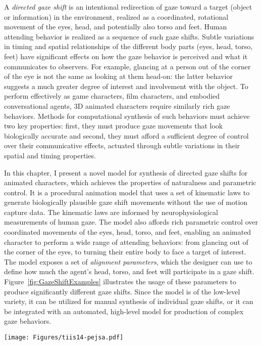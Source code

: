 A \emph{directed gaze shift} is an intentional redirection of gaze toward a target (object or information) in the environment, realized as a coordinated, rotational movement of the eyes, head, and potentially also torso and feet. Human attending behavior is realized as a sequence of such gaze shifts. Subtle variations in timing and spatial relationships of the different body parts (eyes, head, torso, feet) have significant effects on how the gaze behavior is perceived and what it communicates to observers. For example, glancing at a person out of the corner of the eye is not the same as looking at them head-on: the latter behavior suggests a much greater degree of interest and involvement with the object. To perform effectively as game characters, film characters, and embodied conversational agents, 3D animated characters require similarly rich gaze behaviors. Methods for computational synthesis of such behaviors must achieve two key properties: first, they must produce gaze movements that look biologically accurate and second, they must afford a sufficient degree of control over their communicative effects, actuated through subtle variations in their spatial and timing properties.

In this chapter, I present a novel model for synthesis of directed gaze shifts for animated characters, which achieves the properties of naturalness and parametric control. It is a procedural animation model that uses a set of kinematic laws to generate biologically plausible gaze shift movements without the use of motion capture data. The kinematic laws are informed by neurophysiological measurements of human gaze. The model also affords rich parametric control over coordinated movements of the eyes, head, torso, and feet, enabling an animated character to perform a wide range of attending behaviors: from glancing out of the corner of the eyes, to turning their entire body to face a target of interest. The model exposes a set of \emph{alignment parameters}, which the designer can use to define how much the agent's head, torso, and feet will participate in a gaze shift. Figure~\ref{fig:GazeShiftExamples} illustrates the usage of these parameters to produce significantly different gaze shifts. Since the model is of the low-level variety, it can be utilized for manual synthesis of individual gaze shifts, or it can be integrated with an automated, high-level model for production of complex gaze behaviors.

\begin{figure*}
\centering
\texttt{[image: Figures/tiis14-pejsa.pdf]}
\caption{Examples of gaze shifts synthesized using our model. All gaze shifts are toward the same target (the red sphere). (1) Initially the agent maintains eye contact with the observer. (2) Gaze shift to the side with low value of the head alignment parameter. (3) Gaze shift in the same direction, but with high head alignment value. (4) Gaze shift in the same direction with a high torso alignment value. (5) Gaze shift in the same direction with a high whole-body alignment value.}
\label{fig:GazeShiftExamples}
\end{figure*}

